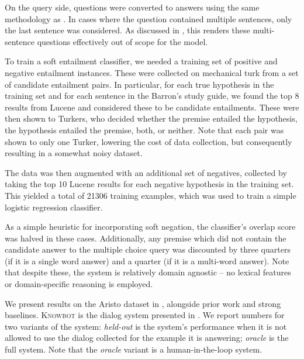 On the query side, questions were converted to answers using the same methodology as
  .
In cases where the question contained multiple sentences, only the last sentence
  was considered.
As discussed in , 
  this renders these multi-sentence questions effectively out of scope for the model.

%
%
To train a soft entailment classifier, we needed a training set of positive
  and negative entailment instances.
These were collected on mechanical turk from a set of candidate entailment pairs.
In particular, for each true hypothesis in the training set and for each sentence
  in the Barron's study guide, we found the top 8 results from Lucene and considered
  these to be candidate entailments.
These were then shown to Turkers, who decided whether the premise entailed the
  hypothesis, the hypothesis entailed the premise, both, or neither.
Note that each pair was shown to only one Turker, lowering the cost of
  data collection, but consequently resulting in a somewhat noisy dataset.

The data was then augmented with an additional set of negatives, collected by taking
  the top 10 Lucene results for each negative hypothesis in the training set.
This yielded a total of \num{21306} training examples, which was used to train
  a simple logistic regression classifier.

As a simple heuristic for incorporating soft negation, the classifier's overlap
  score was halved in these cases.
Additionally, any premise which did not contain the candidate answer to the
  multiple choice query was discounted by three quarters (if it is a single
  word answer) and a quarter (if it is a multi-word answer).
Note that despite these, the system is relatively domain agnostic -- no
  lexical features or domain-specific reasoning is employed.

%
%
We present results on the Aristo dataset in ,
  alongside prior work and strong baselines.
\textsc{Knowbot} is the dialog system presented in 
  .
We report numbers for two variants of the system:
  \textit{held-out} is the system's performance when it is not allowed
  to use the dialog collected for the example it is answering;
  \textit{oracle} is the full system.
Note that the \textit{oracle} variant is a human-in-the-loop system.

